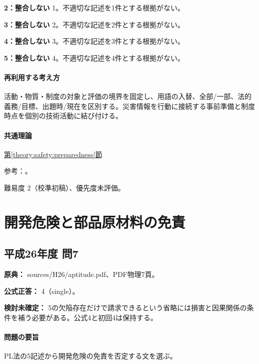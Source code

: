 \noindent\textbf{2：整合しない} 1。不適切な記述を1件とする根拠がない。\par

\noindent\textbf{3：整合しない} 2。不適切な記述を2件とする根拠がない。\par

\noindent\textbf{4：整合しない} 3。不適切な記述を3件とする根拠がない。\par

\noindent\textbf{5：整合しない} 4。不適切な記述を4件とする根拠がない。\par

\paragraph{再利用する考え方} 活動・物質・制度の対象と評価の境界を固定し、用語の入替、全部/一部、法的義務/目標、出題時/現在を区別する。災害情報を行動に接続する事前準備と制度時点を個別の技術活動に結び付ける。

\paragraph{共通理論} \hyperref[theory:safety:preparedness]{第\ref*{theory:safety:preparedness}節}

\par 参考：\cite{env_ar5,env_rain2017,env_evac2021,env_warning2026}。

\par 難易度 2（校準初稿）、優先度未評価。

\section{開発危険と部品原材料の免責}

\subsection{平成26年度 問7}
\label{q:h26-reg-apt-07}

\noindent\textbf{原典：} sources/H26/aptitude.pdf、PDF物理7頁。

\textbf{公式正答：} 4（single）。

\par\textbf{検討未確定：} 5の欠陥存在だけで請求できるという省略には損害と因果関係の条件を補う必要がある。公式4と初回4は保持する。

\paragraph{問題の要旨} PL法の5記述から開発危険の免責を否定する文を選ぶ。


